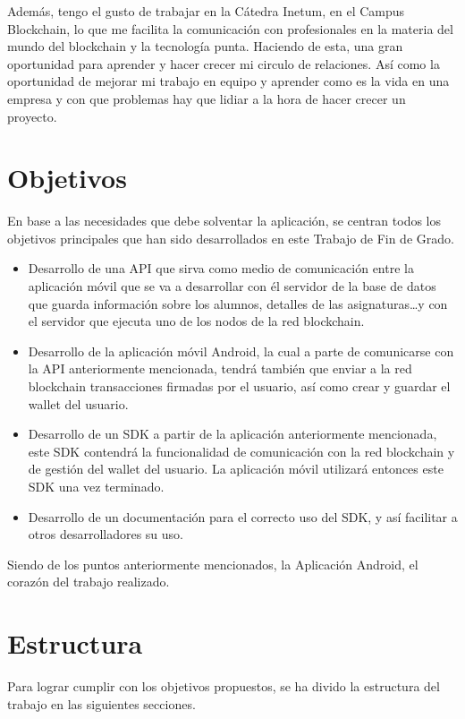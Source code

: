 Además, tengo el gusto de trabajar en la Cátedra Inetum, en el Campus Blockchain, lo que me facilita la comunicación con profesionales en la materia del mundo del blockchain y la tecnología punta. Haciendo de esta, una gran oportunidad para aprender y hacer crecer mi circulo de relaciones. Así como la oportunidad de mejorar mi trabajo en equipo y aprender como es la vida en una empresa y con que problemas hay que lidiar a la hora de hacer crecer un proyecto.

\section{Objetivos}

En base a las necesidades que debe solventar la aplicación, se centran todos los objetivos principales que han sido desarrollados en este Trabajo de Fin de Grado.
\begin{itemize}
\item Desarrollo de una API que sirva como medio de comunicación entre la aplicación móvil que se va a desarrollar con él servidor de la base de datos que guarda información sobre los alumnos, detalles de las asignaturas\dots y con el servidor que ejecuta uno de los nodos de la red blockchain. 
\item Desarrollo de la aplicación móvil Android, la cual a parte de comunicarse con la API anteriormente mencionada, tendrá también que enviar a la red blockchain transacciones firmadas por el usuario, así como crear y guardar el wallet del usuario. 
\item Desarrollo de un SDK a partir de la aplicación anteriormente mencionada, este SDK contendrá la funcionalidad de comunicación con la red blockchain y de gestión del wallet del usuario. La aplicación móvil utilizará entonces este SDK una vez terminado. 
\item Desarrollo de un documentación para el correcto uso del SDK, y así facilitar a otros desarrolladores su uso.
\end{itemize}
Siendo de los puntos anteriormente mencionados, la Aplicación Android, el corazón del trabajo realizado.

\section{Estructura}
Para lograr cumplir con los objetivos propuestos, se ha divido la estructura del trabajo en las siguientes secciones. \\

